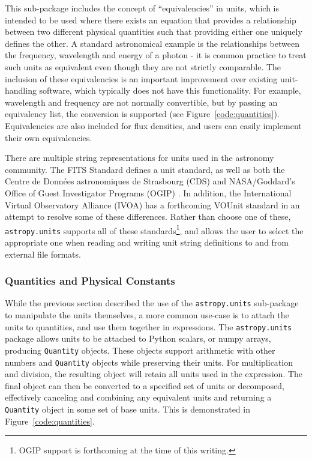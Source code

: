 \documentclass[traditabstract]{aa}
\begin{document}
This sub-package includes the concept of ``equivalencies'' in units, which is
intended to be used where there exists an equation that provides a relationship
between two different physical quantities such that providing either one
uniquely defines the other. A standard astronomical example is the
relationships between the frequency, wavelength and energy of a photon - it is
common practice to treat such units as equivalent even though they are not
strictly comparable. The inclusion of these equivalencies is an important
improvement over existing unit-handling software, which typically does not
have this functionality. For example, wavelength and frequency are not normally
convertible, but by passing an equivalency list, the conversion is supported
(see Figure~\ref{code:quantities}). Equivalencies are also included for flux
densities, and users can easily implement their own equivalencies.

There are multiple string representations for units used in the astronomy
community. The FITS Standard \cite{fits2008} defines a unit standard, as well
as both the Centre de Donn\'ees astronomiques de Strasbourg (CDS)
\citep{ochsenbein2000cds} and NASA/Goddard's Office of Guest Investigator
Programs (OGIP) \citep{george1995ogip}. In addition, the International Virtual
Observatory Alliance (IVOA) has a forthcoming VOUnit standard
\citep{derriere2012vounit} in an attempt to resolve some of these differences.
Rather than choose one of these, \texttt{astropy.units} supports all of these
standards\footnote{OGIP support is forthcoming at the time of this writing.},
and allows the user to select the appropriate one when reading and writing unit
string definitions to and from external file formats.

\subsubsection{Quantities and Physical Constants}

\label{sec:quantities}

While the previous section described the use of the \texttt{astropy.units} sub-package to manipulate
the units themselves, a more common use-case is to attach the units to
quantities, and use them together in expressions. The \texttt{astropy.units}
package allows units to be attached to Python scalars, or \gls{numpy} arrays,
producing \texttt{Quantity} objects. These objects support arithmetic with
other numbers and \texttt{Quantity} objects while preserving their units. For
multiplication and division, the resulting object will retain all units used in
the expression. The final object can then be converted to a specified set of
units or decomposed, effectively canceling and combining any equivalent units
and returning a \texttt{Quantity} object in some set of base units. This is
demonstrated in Figure~\ref{code:quantities}.
\end{document}

